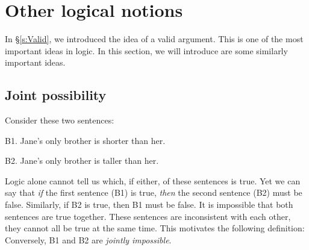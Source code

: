 \chapter{Other logical notions}\label{s:BasicNotions}

In \S\ref{s:Valid}, we introduced the idea of a valid argument.  This is one of the most important ideas in logic. In this section, we will introduce are some similarly important ideas. 



\section{Joint possibility}

Consider these two sentences:
	\begin{ebullet}
		\item[B1.] Jane's only brother is shorter than her.
		\item[B2.] Jane's only brother is taller than her.
	\end{ebullet}
Logic alone cannot tell us which, if either, of these sentences is true. Yet we can say that \emph{if} the first sentence (B1) is true, \emph{then} the second sentence (B2) must be false. Similarly, if B2 is true, then B1 must be false. It is impossible that both sentences are true together. These sentences are inconsistent with each other, they cannot all be true at the same time. This motivates the following definition:
Conversely, B1 and B2 are \emph{jointly impossible}.

